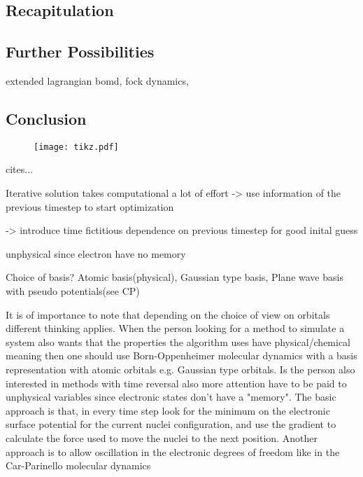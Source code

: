 \documentclass[12pt]{scrartcl}
\begin{document}
\subsection{Recapitulation}
\subsection{Further Possibilities}
extended lagrangian bomd, fock dynamics,
\subsection{Conclusion}

\newpage
\begin{landscape}
\begin{figure}
\texttt{[image: tikz.pdf]}
\end{figure}
%
\end{landscape}
\newpage

cites...
\nocite{car1985unified} %
\nocite{makri1987time} %
\nocite{marx2009ab} %
\nocite{niklasson2009extended} %
\nocite{payne1992iterative} %
\nocite{pulay2004fock} %
\nocite{tangney2002well} %
\nocite{tangney2006theory} %

Iterative solution takes computational a lot of effort -> use information of the previous timestep to start optimization

-> introduce time fictitious dependence on previous timestep for good inital guess

unphysical since electron have no memory


Choice of basis? Atomic basis(physical), Gaussian type basis, Plane wave basis with pseudo potentials(see CP)

It is of importance to note that depending on the choice of view on orbitals different thinking applies. When the person looking for a method to simulate a system also wants that the properties the algorithm uses have physical/chemical meaning then one should use Born-Oppenheimer molecular dynamics with a basis representation with atomic orbitals e.g. Gaussian type orbitals. Is the person also interested in methods with time reversal also more attention have to be paid to unphysical variables since electronic states don't have a "memory". The basic approach is that, in every time step look for the minimum on the electronic surface potential for the current nuclei configuration, and use the gradient to calculate the force used to move the nuclei to the next position. Another approach is to allow oscillation in the electronic degrees of freedom like in the Car-Parinello molecular dynamics 
\end{document}
